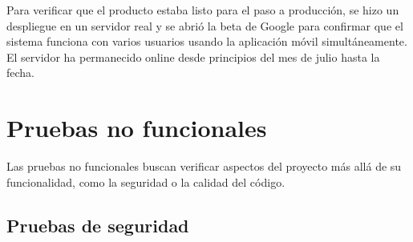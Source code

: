 Para verificar que el producto estaba listo para el paso a producción, se hizo
un despliegue en un servidor real y se abrió la beta de Google para confirmar
que el sistema funciona con varios usuarios usando la aplicación móvil
simultáneamente. El servidor ha permanecido online desde principios del mes de
julio hasta la fecha.


\section{Pruebas no funcionales}

Las pruebas no funcionales buscan verificar aspectos del proyecto más allá de su
funcionalidad, como la seguridad o la calidad del código.

\subsection{Pruebas de seguridad}

